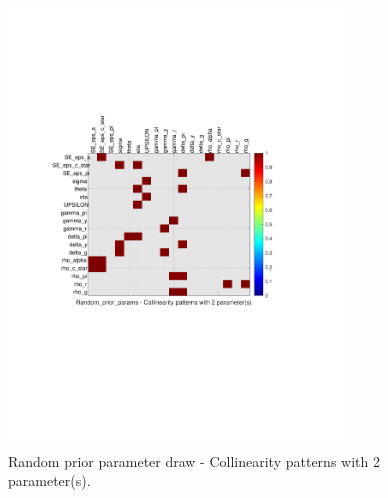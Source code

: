 
\begin{figure}[H]
\centering 
\includegraphics[width=0.8\textwidth]{monetary/identification/monetary_ident_collinearity_Random_prior_params_2}
\caption{Random prior parameter draw  - Collinearity patterns with 2 parameter(s).}\label{Fig:collinearity:Random_prior_params:2_pars}
\end{figure}

